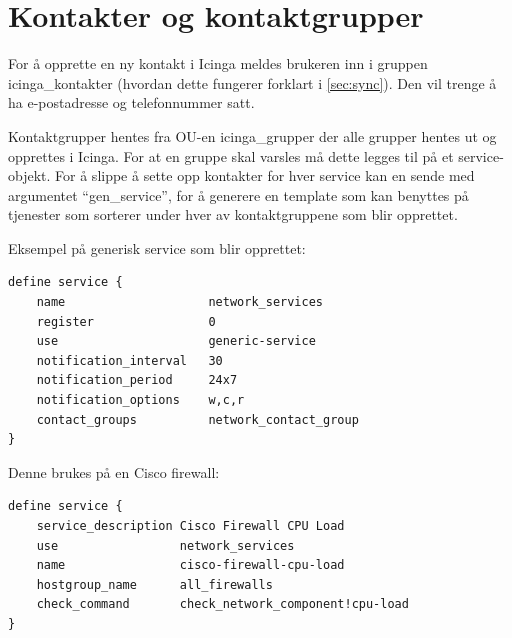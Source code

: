 	\section{Kontakter og kontaktgrupper}
For å opprette en ny kontakt i Icinga meldes brukeren inn i gruppen icinga\_kontakter (hvordan dette fungerer forklart i \ref{sec:sync}). Den vil trenge å ha e-postadresse og telefonnummer satt.

Kontaktgrupper hentes fra OU-en icinga\_grupper der alle grupper hentes ut og opprettes i Icinga. For at en gruppe skal varsles må dette legges til på et service-objekt. For å slippe å sette opp kontakter for hver service kan en sende med argumentet ``gen\_service'', for å generere en template som kan benyttes på tjenester som sorterer under hver av kontaktgruppene som blir opprettet.

Eksempel på generisk service som blir opprettet:
\begin{lstlisting}[style=example]
define service {
    name 				    network_services
    register 		   		0
    use 			   		generic-service     
    notification_interval   30
    notification_period     24x7
    notification_options    w,c,r
    contact_groups          network_contact_group
}
\end{lstlisting}

Denne brukes på en Cisco firewall: 
\begin{lstlisting}[style=example]
define service {
    service_description Cisco Firewall CPU Load
    use 				network_services
    name 				cisco-firewall-cpu-load
    hostgroup_name 		all_firewalls
    check_command 		check_network_component!cpu-load
}
\end{lstlisting}

